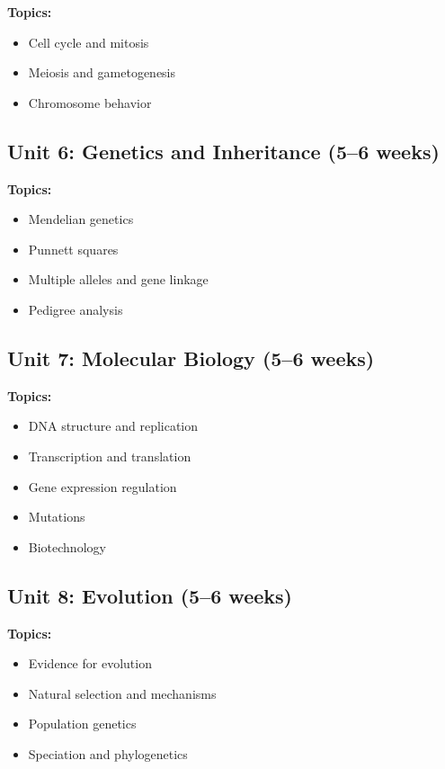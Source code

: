 \documentclass[12pt,oneside]{book}
\begin{document}
\textbf{Topics:}
\begin{itemize}
    \item Cell cycle and mitosis
    \item Meiosis and gametogenesis
    \item Chromosome behavior
\end{itemize}

\subsection{Unit 6: Genetics and Inheritance (5--6 weeks)}

\textbf{Topics:}
\begin{itemize}
    \item Mendelian genetics
    \item Punnett squares
    \item Multiple alleles and gene linkage
    \item Pedigree analysis
\end{itemize}

\subsection{Unit 7: Molecular Biology (5--6 weeks)}

\textbf{Topics:}
\begin{itemize}
    \item DNA structure and replication
    \item Transcription and translation
    \item Gene expression regulation
    \item Mutations
    \item Biotechnology
\end{itemize}

\subsection{Unit 8: Evolution (5--6 weeks)}

\textbf{Topics:}
\begin{itemize}
    \item Evidence for evolution
    \item Natural selection and mechanisms
    \item Population genetics
    \item Speciation and phylogenetics
\end{itemize}
\end{document}

